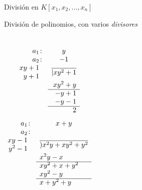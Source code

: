 \documentclass[10pt]{beamer}
\newcommand{\PhantC}{\phantom{\colon}}%
\newcommand{\CenterInCol}[1]{\multicolumn{1}{c}{#1}}
\begin{document}
\begin{frame}{División en $K[x_1,x_2,\ldots,x_n]$}
	\begin{block}{División de polinomios, con varios \emph{divisores}}
		\begin{columns}
				\[
					\begin{array}{rr}
					a_1\colon  & \CenterInCol{y}\\
					a_2\colon  & \CenterInCol{-1}\\
					xy + 1\PhantC & \multirow{2}*{$\overline{|xy^2 + 1}$}\\
					y + 1\PhantC &\\
					& xy^2 + y\\\cline{2-2}
					& -y + 1 \\
					& -y - 1 \\\cline{2-2}
					& 2
					\end{array}
				\]
			\pause
				\[
					\begin{array}{rl}
					a_1\colon  & \CenterInCol{x+y}\\
					a_2\colon  & \\
					xy - 1\PhantC & \multirow{2}*{$\overline{)x^2y + xy^2 + y^2}$}\\
					y^2 - 1\PhantC &\\
					& x^2y - x\\\cline{2-2}
					& xy^2 + x + y^2 \\
					& xy^2 - y \\\cline{2-2}
					& x + y^2 + y
					\end{array}
				\]
		\end{columns}	
	\end{block}
\end{frame}
\end{document}
